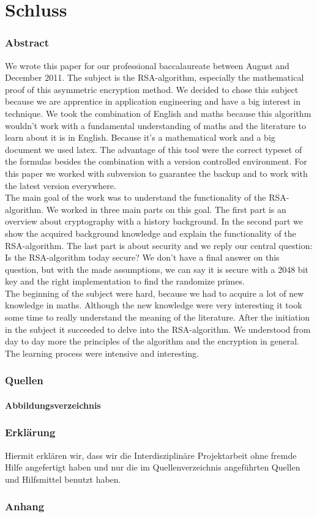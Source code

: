 \part{Schluss}
\section{Abstract}
We wrote this paper for our professional baccalaureate between August and December 2011. The subject is the RSA-algorithm, especially the mathematical proof of this asymmetric encryption method. We decided to chose this subject because we are apprentice in application engineering and have a big interest in technique. We took the combination of English and maths because this algorithm wouldn't work with a fundamental understanding of maths and the literature to learn about it is in English. Because it's a mathematical work and a big document we used latex. The advantage of this tool were the correct typeset of the formulas besides the combination with a version controlled environment. For this paper we worked with subversion to guarantee the backup and to work with the latest version everywhere. \\
The main goal of the work was to understand the functionality of the RSA-algorithm. We worked in three main parts on this goal. The first part is an overview about cryptography with a history background. In the second part we show the acquired background knowledge and explain the functionality of the RSA-algorithm. The last part is about security and we reply our central question: Is the RSA-algorithm today secure? We don't have a final answer on this question, but with the made assumptions, %
we can say it is secure with a 2048 bit key and the right implementation to find the randomize primes. \\
The beginning of the subject were hard, because we had to acquire a lot of new knowledge in maths. Although the new knowledge were very interesting it took some time to really understand the meaning of the literature. After the initiation in the subject it succeeded to delve into the RSA-algorithm. %
We understood from day to day more the principles of the algorithm and the encryption in general. The learning process were intensive and interesting. 

\section{Quellen}
\subsection{Abbildungsverzeichnis}
\section{Erklärung}
Hiermit erklären wir, dass wir die Interdisziplinäre Projektarbeit ohne fremde Hilfe angefertigt haben und nur die im Quellenverzeichnis angeführten Quellen und Hilfsmittel benutzt haben.
\section{Anhang}
